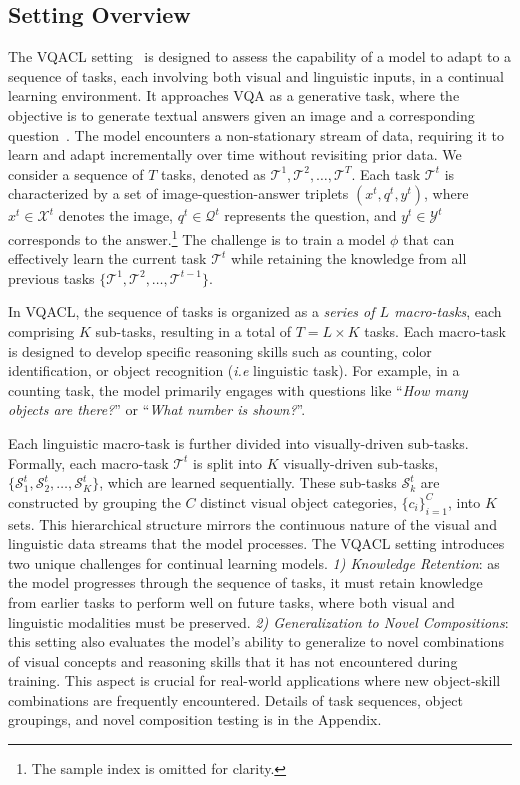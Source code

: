 \subsection{Setting Overview}
\label{sec:setting}
The VQACL setting~\citep{zhang2023vqacl} is designed to assess the capability of a model to adapt to a sequence of tasks, each involving both visual and linguistic inputs, in a continual learning environment. It approaches VQA as a generative task, where the objective is to generate textual answers given an image and a corresponding question~\citep{ghosh2024exploringfrontiervisionlanguagemodels, zhang2023vqacl}. The model encounters a non-stationary stream of data, requiring it to learn and adapt incrementally over time without revisiting prior data. We consider a sequence of $T$ tasks, denoted as $ \mathcal{T}^1, \mathcal{T}^2, \ldots, \mathcal{T}^T$. Each task $\mathcal{T}^t$ is characterized by a set of image-question-answer triplets $(x^t, q^t, y^t)$, where $x^t \in \mathcal{X}^t$ denotes the image, $q^t \in \mathcal{Q}^t$ represents the question, and $y^t \in \mathcal{Y}^t$ corresponds to the answer.\footnote{The sample index is omitted for clarity.} The challenge is to train a model $\phi$ that can effectively learn the current task $\mathcal{T}^t$ while retaining the knowledge from all previous tasks $\{\mathcal{T}^1, \mathcal{T}^2, \ldots, \mathcal{T}^{t-1}\}$. 

In VQACL, the sequence of tasks is organized as a \emph{series of \( L \) macro-tasks}, each comprising \( K \) sub-tasks, resulting in a total of \( T = L \times K \) tasks. Each macro-task is designed to develop specific reasoning skills such as counting, color identification, or object recognition (\textit{i.e} linguistic task). For example, in a counting task, the model primarily engages with questions like ``\textit{How many objects are there?}'' or ``\textit{What number is shown?}''.

Each linguistic macro-task is further divided into visually-driven sub-tasks. Formally, each macro-task \( \mathcal{T}^t \) is split into \( K \) visually-driven sub-tasks, \( \{\mathcal{S}^t_1, \mathcal{S}^t_2, \ldots, \mathcal{S}^t_K\} \), which are learned sequentially. These sub-tasks \( \mathcal{S}^t_k \) are constructed by grouping the \( C \) distinct visual object categories, \( \{c_i\}_{i=1}^C \), into \( K \) sets. This hierarchical structure mirrors the continuous nature of the visual and linguistic data streams that the model processes. 
The VQACL setting introduces two unique challenges for continual learning models. \textit{1) Knowledge Retention}: as the model progresses through the sequence of tasks, it must retain knowledge from earlier tasks to perform well on future tasks, where both visual and linguistic modalities must be preserved. \textit{2) Generalization to Novel Compositions}: this setting also evaluates the model's ability to generalize to novel combinations of visual concepts and reasoning skills that it has not encountered during training. This aspect is crucial for real-world applications where new object-skill combinations are frequently encountered. Details of task sequences, object groupings, and novel composition testing is in the Appendix.
